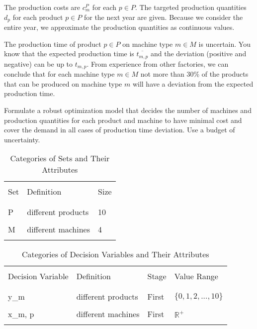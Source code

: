 \documentclass[fleqn,10pt]{wlscirep}
\begin{document}
The production costs are $c^{P}_{m}$ for each $p \in P$. The targeted production quantities $d_{p}$ for each product $p \in P$ for the next year are given. Because we consider the entire year, we approximate the production quantities as continuous values.

The production time of product $p \in P$ on machine type $m \in M$ is uncertain. You know that the expected production time is $\overline{t_{m, p}}$ and the deviation (positive and negative) can be up to $t_{m, p}$. From experience from other factories, we can conclude that for each machine type $m \in M$ not more than 30\% of the products that can be produced on machine type $m$ will have a deviation from the expected production time.

Formulate a robust optimization model that decides the number of machines and production quantities for each product and machine to have minimal cost and cover the demand in all cases of production time deviation. Use a budget of uncertainty.

\begin{table}[ht]
    \centering
    \begin{tabular}{lll}
    \hline
    \\[-1em]
    Set & Definition & Size \\
    \\[-1em]
    \hline
    \\[-1em]
    P & different products & 10 \\
    \\[-1em]
    M & different machines & 4 \\
    \\[-1em]
    \hline
    \end{tabular}
    \caption{Categories of Sets and Their Attributes}
\end{table}

\begin{table}[ht]
    \centering
    \begin{tabular}{llll}
    \hline
    \\[-1em]
    Decision Variable & Definition & Stage & Value Range \\
    \\[-1em]
    \hline
    \\[-1em]
    y_{m} & different products & First & $\{0, 1, 2, ..., 10\}$ \\
    \\[-1em]
    x_{m, p} & different machines & First & $\mathbb{R}^+$ \\
    \\[-1em]
    \hline
    \end{tabular}
    \caption{Categories of Decision Variables and Their Attributes}
\end{table}
\end{document}

